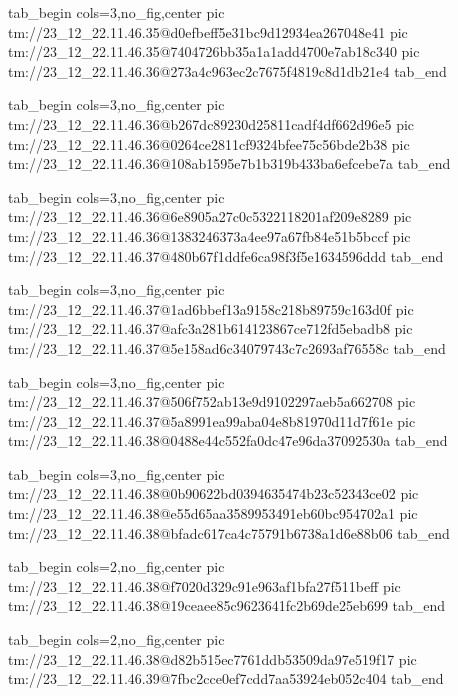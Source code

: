  
 
 
 
 

\qqSecCmtScr


\ifcmt
  tab_begin cols=3,no_fig,center
    pic tm://23_12_22.11.46.35@d0efbeff5e31bc9d12934ea267048e41
    pic tm://23_12_22.11.46.35@7404726bb35a1a1add4700e7ab18c340
    pic tm://23_12_22.11.46.36@273a4c963ec2c7675f4819c8d1db21e4
  tab_end
\fi


\ifcmt
  tab_begin cols=3,no_fig,center
    pic tm://23_12_22.11.46.36@b267dc89230d25811cadf4df662d96e5
    pic tm://23_12_22.11.46.36@0264ce2811cf9324bfee75c56bde2b38
    pic tm://23_12_22.11.46.36@108ab1595e7b1b319b433ba6efcebe7a
  tab_end
\fi


\ifcmt
  tab_begin cols=3,no_fig,center
    pic tm://23_12_22.11.46.36@6e8905a27c0c5322118201af209e8289
    pic tm://23_12_22.11.46.36@1383246373a4ee97a67fb84e51b5bccf
    pic tm://23_12_22.11.46.37@480b67f1ddfe6ca98f3f5e1634596ddd
  tab_end
\fi


\ifcmt
  tab_begin cols=3,no_fig,center
    pic tm://23_12_22.11.46.37@1ad6bbef13a9158c218b89759c163d0f
    pic tm://23_12_22.11.46.37@afc3a281b614123867ce712fd5ebadb8
    pic tm://23_12_22.11.46.37@5e158ad6c34079743c7c2693af76558c
  tab_end
\fi


\ifcmt
  tab_begin cols=3,no_fig,center
    pic tm://23_12_22.11.46.37@506f752ab13e9d9102297aeb5a662708
    pic tm://23_12_22.11.46.37@5a8991ea99aba04e8b81970d11d7f61e
    pic tm://23_12_22.11.46.38@0488e44c552fa0dc47e96da37092530a
  tab_end
\fi


\ifcmt
  tab_begin cols=3,no_fig,center
    pic tm://23_12_22.11.46.38@0b90622bd0394635474b23c52343ce02
    pic tm://23_12_22.11.46.38@e55d65aa3589953491eb60bc954702a1
    pic tm://23_12_22.11.46.38@bfadc617ca4c75791b6738a1d6e88b06
  tab_end
\fi


\ifcmt
  tab_begin cols=2,no_fig,center
    pic tm://23_12_22.11.46.38@f7020d329c91e963af1bfa27f511beff
    pic tm://23_12_22.11.46.38@19ceaee85c9623641fc2b69de25eb699
  tab_end
\fi


\ifcmt
  tab_begin cols=2,no_fig,center
    pic tm://23_12_22.11.46.38@d82b515ec7761ddb53509da97e519f17
    pic tm://23_12_22.11.46.39@7fbc2cce0ef7cdd7aa53924eb052c404
  tab_end
\fi

